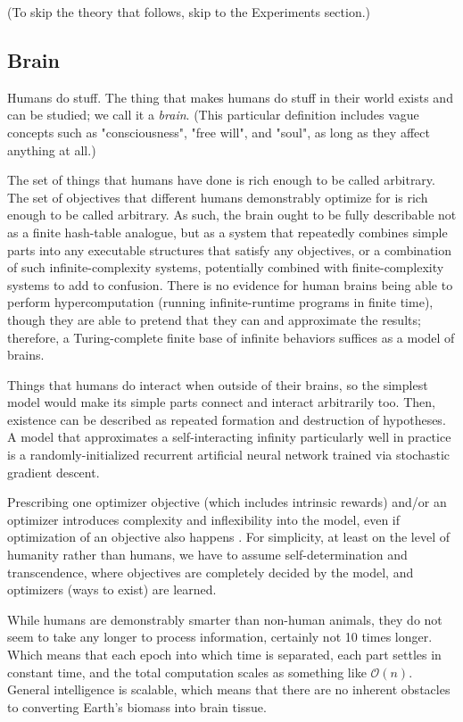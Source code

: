 \documentclass{article}
\begin{document}
(To skip the theory that follows, skip to the Experiments section.)

\subsection{Brain}

Humans do stuff. The thing that makes humans do stuff in their world exists and can be studied; we call it a \textit{brain}. (This particular definition includes vague concepts such as "consciousness", "free will", and "soul", as long as they affect anything at all.)

The set of things that humans have done is rich enough to be called arbitrary. The set of objectives that different humans demonstrably optimize for is rich enough to be called arbitrary. As such, the brain ought to be fully describable not as a finite hash-table analogue, but as a system that repeatedly combines simple parts into any executable structures that satisfy any objectives, or a combination of such infinite-complexity systems, potentially combined with finite-complexity systems to add to confusion. There is no evidence for human brains being able to perform hypercomputation (running infinite-runtime programs in finite time), though they are able to pretend that they can and approximate the results; therefore, a Turing-complete finite base of infinite behaviors suffices as a model of brains.

Things that humans do interact when outside of their brains, so the simplest model would make its simple parts connect and interact arbitrarily too. Then, existence can be described as repeated formation and destruction of hypotheses. A model that approximates a self-interacting infinity particularly well in practice is a randomly-initialized recurrent artificial neural network trained via stochastic gradient descent.

Prescribing one optimizer objective (which includes intrinsic rewards) and/or an optimizer introduces complexity and inflexibility into the model, even if optimization of an objective also happens \cite{Dabney2020}. For simplicity, at least on the level of humanity rather than humans, we have to assume self-determination and transcendence, where objectives are completely decided by the model, and optimizers (ways to exist) are learned.

While humans are demonstrably smarter than non-human animals, they do not seem to take any longer to process information, certainly not 10 times longer. Which means that each epoch into which time is separated, each part settles in constant time, and the total computation scales as something like $\mathcal{O}(n)$. General intelligence is scalable, which means that there are no inherent obstacles to converting Earth's biomass into brain tissue.
\end{document}
